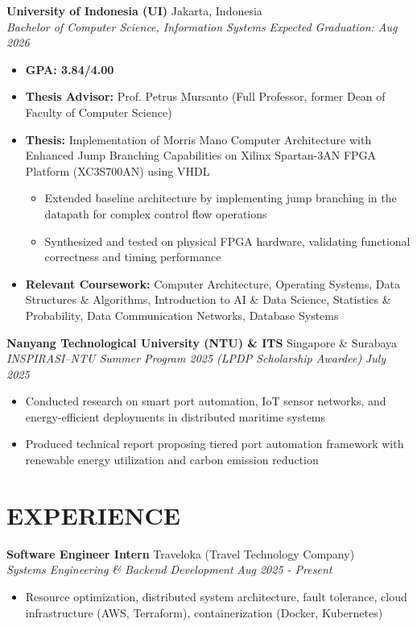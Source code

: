 \documentclass[10pt,a4paper]{article}
\newcommand{\experienceheader}[4]{
    \textbf{#1} \hfill #2 \\
    \textit{#3} \hfill \textit{#4}
}
\begin{document}
\experienceheader{University of Indonesia (UI)}{Jakarta, Indonesia}{Bachelor of Computer Science, Information Systems}{Expected Graduation: Aug 2026}
\begin{itemize}[leftmargin=*, itemsep=1pt, topsep=1pt]
    \item \textbf{GPA: 3.84/4.00}
    \item \textbf{Thesis Advisor:} Prof. Petrus Mursanto (Full Professor, former Dean of Faculty of Computer Science)
    \item \textbf{Thesis:} Implementation of Morris Mano Computer Architecture with Enhanced Jump Branching Capabilities on Xilinx Spartan-3AN FPGA Platform (XC3S700AN) using VHDL
    \begin{itemize}[leftmargin=*, itemsep=0.5pt, topsep=0.5pt]
        \item Extended baseline architecture by implementing jump branching in the datapath for complex control flow operations
        \item Synthesized and tested on physical FPGA hardware, validating functional correctness and timing performance
    \end{itemize}
    \item \textbf{Relevant Coursework:} Computer Architecture, Operating Systems, Data Structures \& Algorithms, Introduction to AI \& Data Science, Statistics \& Probability, Data Communication Networks, Database Systems
\end{itemize}
\experienceheader{Nanyang Technological University (NTU) \& ITS}{Singapore \& Surabaya}{INSPIRASI–NTU Summer Program 2025 (LPDP Scholarship Awardee)}{July 2025}
\begin{itemize}[leftmargin=*, itemsep=1pt, topsep=1pt]
    \item Conducted research on smart port automation, IoT sensor networks, and energy-efficient deployments in distributed maritime systems
    \item Produced technical report proposing tiered port automation framework with renewable energy utilization and carbon emission reduction
\end{itemize}

\section*{EXPERIENCE}

\experienceheader{Software Engineer Intern}{Traveloka (Travel Technology Company)}{Systems Engineering \& Backend Development}{Aug 2025 - Present}
\begin{itemize}[leftmargin=*, itemsep=1pt, topsep=1pt]
    \item Resource optimization, distributed system architecture, fault tolerance, cloud infrastructure (AWS, Terraform), containerization (Docker, Kubernetes)
\end{itemize}
\end{document}
